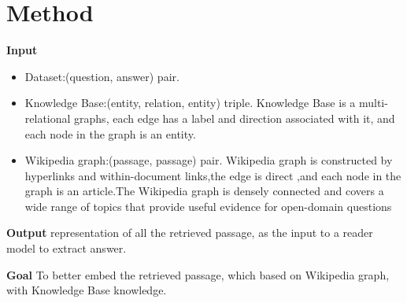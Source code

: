 \documentclass[sigconf]{acmart}
\begin{document}
	\section{Method}
	
	\textbf{Input}
		\begin{itemize}
			\item {Dataset}:(question, answer) pair.
			
			\item{ Knowledge Base}:(entity, relation, entity) triple.
			 Knowledge Base is a multi-relational graphs, each edge has a label and direction associated with it, and each node in the graph is an entity.
			 
			 \item{ Wikipedia graph\cite{asai2019learning}}:(passage, passage) pair.
			 Wikipedia graph is constructed by hyperlinks and within-document links,the edge is direct ,and  each node in the graph is an article.The Wikipedia graph is densely connected and covers a wide range of topics that provide useful evidence for open-domain questions
				
		\end{itemize}
		

	\textbf{Output}
	representation of all the retrieved passage, as the input to a reader model to extract answer.
	
	\textbf{Goal} 
	To better embed the retrieved passage, which based on Wikipedia graph, with  Knowledge Base knowledge.
	
\end{document}
